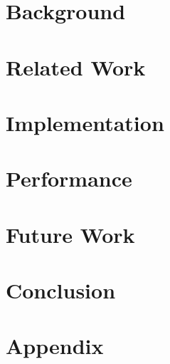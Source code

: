 \documentclass[headsepline,footsepline,footinclude=false,oneside,fontsize=11pt,paper=a4,listof=totoc,bibliography=totoc]{scrbook} %
\begin{document}


\frontmatter{}





\tableofcontents{}

\mainmatter{}




\chapter{Background}




\chapter{Related Work}



\chapter{Implementation}


\chapter{Performance}


\chapter{Future Work}


\chapter{Conclusion}



\appendix
\chapter{Appendix} \label{sec:appendix}

\appendix{}




\listoffigures{}
\listoftables{}
\printbibliography{}
\end{document}
